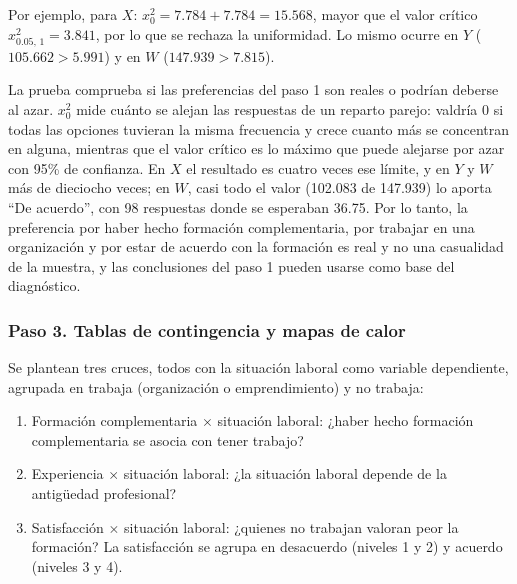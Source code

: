 \documentclass[12pt, a4paper]{article}
\begin{document}
Por ejemplo, para $X$: $x_0^2 = 7.784 + 7.784 = 15.568$, mayor que el
valor crítico $x^2_{0.05,\,1} = 3.841$, por lo que se rechaza la
uniformidad. Lo mismo ocurre en $Y$ ($105.662 > 5.991$) y en $W$
($147.939 > 7.815$).

La prueba comprueba si las preferencias del paso 1 son reales o podrían
deberse al azar. $x_0^2$ mide cuánto se alejan las respuestas de un
reparto parejo: valdría 0 si todas las opciones tuvieran la misma
frecuencia y crece cuanto más se concentran en alguna, mientras que el
valor crítico es lo máximo que puede alejarse por azar con 95\% de
confianza. En $X$ el resultado es cuatro veces ese límite, y en $Y$ y $W$
más de dieciocho veces; en $W$, casi todo el valor (102.083 de 147.939)
lo aporta ``De acuerdo'', con 98 respuestas donde se esperaban 36.75. Por
lo tanto, la preferencia por haber hecho formación complementaria, por
trabajar en una organización y por estar de acuerdo con la formación es
real y no una casualidad de la muestra, y las conclusiones del paso 1
pueden usarse como base del diagnóstico.

\subsubsection{Paso 3. Tablas de contingencia y mapas de calor}

Se plantean tres cruces, todos con la situación laboral como variable
dependiente, agrupada en trabaja (organización o emprendimiento) y no
trabaja:

\begin{enumerate}
  \item Formación complementaria $\times$ situación laboral: ¿haber hecho
  formación complementaria se asocia con tener trabajo?
  \item Experiencia $\times$ situación laboral: ¿la situación laboral
  depende de la antigüedad profesional?
  \item Satisfacción $\times$ situación laboral: ¿quienes no trabajan
  valoran peor la formación? La satisfacción se agrupa en desacuerdo
  (niveles 1 y 2) y acuerdo (niveles 3 y 4).
\end{enumerate}
\end{document}

